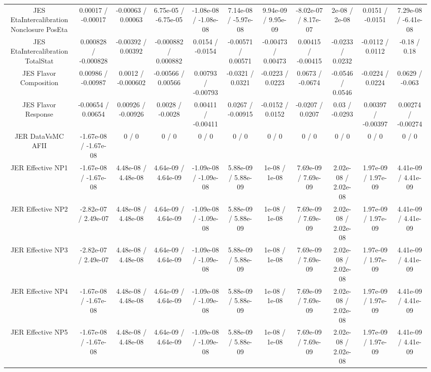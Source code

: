 \begin{table}[htbp]
\begin{center}
\begin{tabular}{|c|c|c|c|c|c|c|c|c|c|c|}
  JES EtaIntercalibration Nonclosure PosEta & 0.00017 / -0.00017 & -0.00063 / 0.00063 & 6.75e-05 / -6.75e-05 & -1.08e-08 / -1.08e-08 & 7.14e-08 / -5.97e-08 & 9.94e-09 / 9.95e-09 & -8.02e-07 / 8.17e-07 & 2e-08 / 2e-08 & 0.0151 / -0.0151 & 7.29e-08 / -6.41e-08 \\ 
  JES EtaIntercalibration TotalStat & 0.000828 / -0.000828 & -0.00392 / 0.00392 & -0.000882 / 0.000882 & 0.0154 / -0.0154 & -0.00571 / 0.00571 & -0.00473 / 0.00473 & 0.00415 / -0.00415 & -0.0233 / 0.0232 & -0.0112 / 0.0112 & -0.18 / 0.18 \\ 
  JES Flavor Composition & 0.00986 / -0.00987 & 0.0012 / -0.000602 & -0.00566 / 0.00566 & 0.00793 / -0.00793 & -0.0321 / 0.0321 & -0.0223 / 0.0223 & 0.0673 / -0.0674 & -0.0546 / 0.0546 & -0.0224 / 0.0224 & 0.0629 / -0.063 \\ 
  JES Flavor Response & -0.00654 / 0.00654 & 0.00926 / -0.00926 & 0.0028 / -0.0028 & 0.00411 / -0.00411 & 0.0267 / -0.00915 & -0.0152 / 0.0152 & -0.0207 / 0.0207 & 0.03 / -0.0293 & 0.00397 / -0.00397 & 0.00274 / -0.00274 \\ 
  JER DataVsMC AFII & -1.67e-08 / -1.67e-08 & 0 / 0 & 0 / 0 & 0 / 0 & 0 / 0 & 0 / 0 & 0 / 0 & 0 / 0 & 0 / 0 & 0 / 0 \\ 
  JER Effective NP1 & -1.67e-08 / -1.67e-08 & 4.48e-08 / 4.48e-08 & 4.64e-09 / 4.64e-09 & -1.09e-08 / -1.09e-08 & 5.88e-09 / 5.88e-09 & 1e-08 / 1e-08 & 7.69e-09 / 7.69e-09 & 2.02e-08 / 2.02e-08 & 1.97e-09 / 1.97e-09 & 4.41e-09 / 4.41e-09 \\ 
  JER Effective NP2 & -2.82e-07 / 2.49e-07 & 4.48e-08 / 4.48e-08 & 4.64e-09 / 4.64e-09 & -1.09e-08 / -1.09e-08 & 5.88e-09 / 5.88e-09 & 1e-08 / 1e-08 & 7.69e-09 / 7.69e-09 & 2.02e-08 / 2.02e-08 & 1.97e-09 / 1.97e-09 & 4.41e-09 / 4.41e-09 \\ 
  JER Effective NP3 & -2.82e-07 / 2.49e-07 & 4.48e-08 / 4.48e-08 & 4.64e-09 / 4.64e-09 & -1.09e-08 / -1.09e-08 & 5.88e-09 / 5.88e-09 & 1e-08 / 1e-08 & 7.69e-09 / 7.69e-09 & 2.02e-08 / 2.02e-08 & 1.97e-09 / 1.97e-09 & 4.41e-09 / 4.41e-09 \\ 
  JER Effective NP4 & -1.67e-08 / -1.67e-08 & 4.48e-08 / 4.48e-08 & 4.64e-09 / 4.64e-09 & -1.09e-08 / -1.09e-08 & 5.88e-09 / 5.88e-09 & 1e-08 / 1e-08 & 7.69e-09 / 7.69e-09 & 2.02e-08 / 2.02e-08 & 1.97e-09 / 1.97e-09 & 4.41e-09 / 4.41e-09 \\ 
  JER Effective NP5 & -1.67e-08 / -1.67e-08 & 4.48e-08 / 4.48e-08 & 4.64e-09 / 4.64e-09 & -1.09e-08 / -1.09e-08 & 5.88e-09 / 5.88e-09 & 1e-08 / 1e-08 & 7.69e-09 / 7.69e-09 & 2.02e-08 / 2.02e-08 & 1.97e-09 / 1.97e-09 & 4.41e-09 / 4.41e-09 \\ 

\end{tabular}
\end{center}
\end{table}
